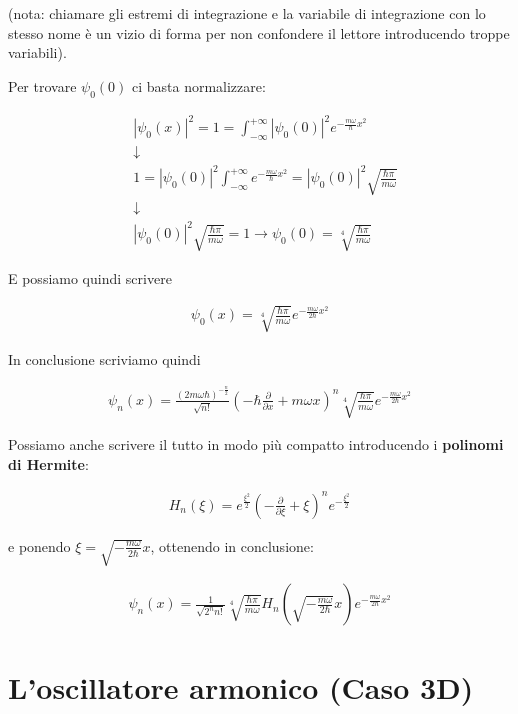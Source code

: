 (nota: chiamare gli estremi di integrazione e la variabile di integrazione con lo stesso nome è un vizio di forma per non confondere il lettore introducendo troppe variabili).

Per trovare $\psi_0(0)$ ci basta normalizzare:

\begin{align}
{}&|\psi_0(x)|^2 = 1 = \int_{-\infty}^{+\infty} |\psi_0(0)|^2 e^{-\frac{m\omega}{\hbar}x^2} \nonumber \\
& \downarrow \nonumber \\
&1=|\psi_0(0)|^2 \int_{-\infty}^{+\infty}  e^{-\frac{m\omega}{\hbar}x^2} = |\psi_0(0)|^2 \sqrt{\frac{\hbar \pi}{m \omega}}\nonumber \\
& \downarrow \nonumber \\
&|\psi_0(0)|^2 \sqrt{\frac{\hbar \pi}{m \omega}}=1 \rightarrow \psi_0(0)= \sqrt[4]{\frac{\hbar \pi}{m \omega}}
\end{align}

E possiamo quindi scrivere

\begin{align}
\psi_0(x) = \sqrt[4]{\frac{\hbar \pi}{m \omega}} e^{-\frac{m\omega}{2\hbar}x^2}
\end{align}

In conclusione scriviamo quindi

\begin{align}
\psi_n(x)= \frac{(2m\omega \hbar)^{-\frac{n}{2}}}{\sqrt{n!}}\left( -\hbar \frac{\partial}{\partial x} + m\omega x \right)^n \sqrt[4]{\frac{\hbar \pi}{m \omega}} e^{-\frac{m\omega}{2\hbar}x^2}
\end{align}

Possiamo anche scrivere il tutto in modo più compatto introducendo i \textbf{polinomi di Hermite}:

\begin{align}
H_n(\xi) = e^{\frac{\xi^2}{2}} \left( -\frac{\partial}{\partial \xi} + \xi \right)^n e^{-\frac{\xi^2}{2}}
\end{align}

e ponendo $\xi = \sqrt{-\frac{m\omega}{2\hbar}}x$, ottenendo in conclusione:

\begin{align}
\psi_n(x)= \frac{1}{\sqrt{2^n n!}}\sqrt[4]{\frac{\hbar \pi}{m \omega}}H_n\left(\sqrt{-\frac{m\omega}{2\hbar}}x\right) e^{-\frac{m\omega}{2\hbar}x^2}
\end{align}

\newpage

\section{L'oscillatore armonico (Caso 3D)}

